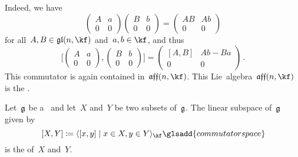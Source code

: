 \begin{examples}
\begin{enumerate}
			Indeed, we have
			\[
				\begin{pmatrix}
					A & a \\
					0 & 0
				\end{pmatrix}
				\begin{pmatrix}
					B & b \\
					0 & 0
				\end{pmatrix}
				=
				\begin{pmatrix}
					A B & A b \\
					0   & 0
				\end{pmatrix}
			\]
			for all~$A, B \in \gllie(n, \kf)$ and~$a, b \in \kf$, and thus
			\[
				\Biggl[
					\begin{pmatrix}
						A & a \\
						0 & 0
					\end{pmatrix}
					,
					\begin{pmatrix}
						B & b \\
						0 & 0
					\end{pmatrix}
				\Biggr]
				=
				\begin{pmatrix}
					[A, B]  & A b - B a \\
					0       & 0
				\end{pmatrix} \,.
			\]
			This commutator is again contained in~$\afflie(n, \kf)$.
			This Lie~algebra~$\afflie(n, \kf)$ is the .
	\end{enumerate}
\end{examples}




\begin{definition}
	Let~$\mathfrak{g}$ be a~\liealgebra{$\kf$} and let~$X$ and~$Y$ be two subsets of~$\mathfrak{g}$.
	The linear subspace of~$\mathfrak{g}$ given by
	\[
		[X,Y]
		\defined
		\gen{
			[x,y]
		\suchthat
			x \in X,
			y \in Y
		}_{\kf}
		\glsadd{commutator space}
	\]
	is the  of~$X$ and~$Y$.
\end{definition}


